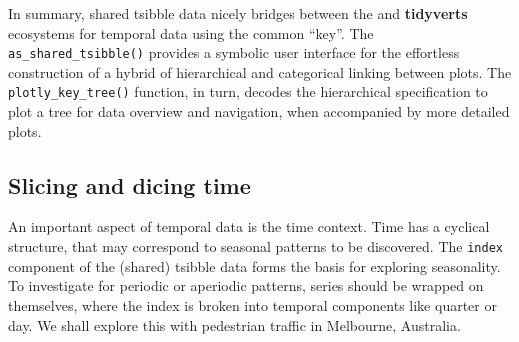In summary, shared tsibble data nicely bridges between the
 and \textbf{tidyverts} ecosystems for temporal data
using the common ``key''. The \texttt{as\_shared\_tsibble()} provides a
symbolic user interface for the effortless construction of a hybrid of
hierarchical and categorical linking between plots. The
\texttt{plotly\_key\_tree()} function, in turn, decodes the hierarchical
specification to plot a tree for data overview and navigation, when
accompanied by more detailed plots.

\hypertarget{slicing-and-dicing-time}{%
\subsection{Slicing and dicing time}\label{slicing-and-dicing-time}}

An important aspect of temporal data is the time context. Time has a
cyclical structure, that may correspond to seasonal patterns to be
discovered. The \texttt{index} component of the (shared) tsibble data
forms the basis for exploring seasonality. To investigate for periodic
or aperiodic patterns, series should be wrapped on themselves, where the
index is broken into temporal components like quarter or day. We shall
explore this with pedestrian traffic in Melbourne, Australia.

